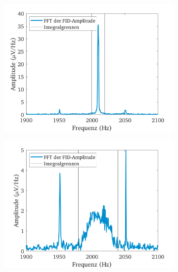 \documentclass[../main.tex]{subfiles}
\begin{document}
    \begin{figure}[H]
            \begin{subfigure}[c]{0.5\textwidth}
                \includegraphics[width=\linewidth]{Bilddateien/9/optimal/Fig_2}
                \label{fig:Hahn_Spektrun_opt}
            \end{subfigure}
            \begin{subfigure}[c]{0.5\textwidth}
                \includegraphics[width=\linewidth]{Bilddateien/9/worse_negative/Fig_2}
                \label{fig:Hahn_Spektrum_neg}
            \end{subfigure}

\end{figure}
\end{document}
